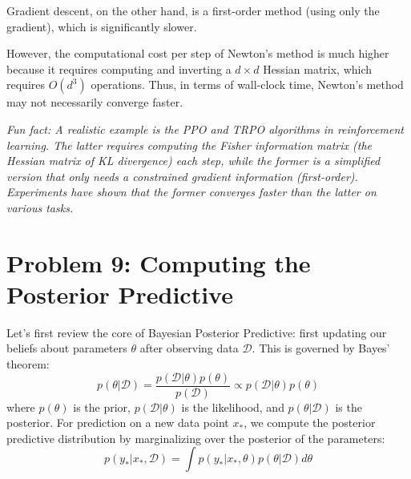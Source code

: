\documentclass[11pt, a4paper, oneside]{memoir}
\begin{document}
Gradient descent, on the other hand, is a first-order method (using only the gradient),
which is significantly slower.

However, the computational cost per step of Newton's method is much higher
because it requires computing and inverting a $d \times d$ Hessian matrix,
which requires $O(d^3)$ operations. Thus, in terms of wall-clock time, Newton's method may not necessarily converge faster.

\textit{Fun fact: A realistic example is the PPO and TRPO algorithms in reinforcement learning.
    The latter requires computing the Fisher information matrix (the Hessian matrix of KL divergence) each step,
    while the former is a simplified version that only needs a constrained gradient information (first-order).
    Experiments have shown that the former converges faster than the latter on various tasks.}

\chapter{Problem 9: Computing the Posterior Predictive}
Let's first review the core of Bayesian Posterior Predictive: first updating our beliefs about parameters $\theta$ after observing data $\mathcal{D}$.
This is governed by Bayes' theorem:
\[ p(\theta | \mathcal{D}) = \frac{p(\mathcal{D} | \theta) p(\theta)}{p(\mathcal{D})} \propto p(\mathcal{D} | \theta) p(\theta) \]
where $p(\theta)$ is the prior, $p(\mathcal{D} | \theta)$ is the likelihood, and $p(\theta | \mathcal{D})$ is the posterior.
For prediction on a new data point $x_*$, we compute the posterior predictive distribution by marginalizing over the posterior of the parameters:
\[ p(y_* | x_*, \mathcal{D}) = \int p(y_* | x_*, \theta) p(\theta | \mathcal{D}) d\theta \]
\end{document}
